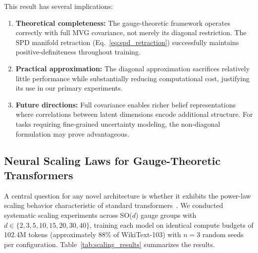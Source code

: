 \documentclass[twoside,11pt]{article}
\begin{document}
This result has several implications:
\begin{enumerate}
    \item \textbf{Theoretical completeness:} The gauge-theoretic framework operates correctly with full MVG covariance, not merely its diagonal restriction. The SPD manifold retraction (Eq.~\ref{eq:spd_retraction}) successfully maintains positive-definiteness throughout training.

    \item \textbf{Practical approximation:} The diagonal approximation sacrifices relatively little performance while substantially reducing computational cost, justifying its use in our primary experiments.

    \item \textbf{Future directions:} Full covariance enables richer belief representations where correlations between latent dimensions encode additional structure. For tasks requiring fine-grained uncertainty modeling, the non-diagonal formulation may prove advantageous.
\end{enumerate}

\subsection{Neural Scaling Laws for Gauge-Theoretic Transformers}
\label{sec:scaling_laws}

A central question for any novel architecture is whether it exhibits the power-law scaling behavior characteristic of standard transformers~\citep{kaplan2020scaling, hoffmann2022training}. We conducted systematic scaling experiments across SO($d$) gauge groups with $d \in \{2, 3, 5, 10, 15, 20, 30, 40\}$, training each model on identical compute budgets of 102.4M tokens (approximately 88\% of WikiText-103) with $n=3$ random seeds per configuration. Table~\ref{tab:scaling_results} summarizes the results.
\end{document}
